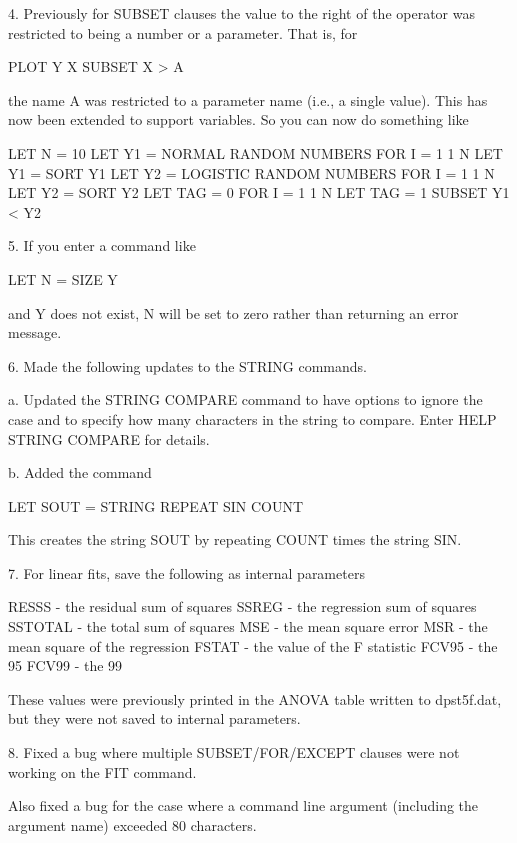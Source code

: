  4. Previously for SUBSET clauses the value to the right of the
    operator was restricted to being a number or a parameter.  That
    is, for

         PLOT Y X  SUBSET X > A

    the name A was restricted to a parameter name (i.e., a single
    value).  This has now been extended to support variables.  So
    you can now do something like

         LET N = 10
         LET Y1 = NORMAL RANDOM NUMBERS FOR I = 1 1 N
         LET Y1 = SORT Y1
         LET Y2 = LOGISTIC RANDOM NUMBERS FOR I = 1 1 N
         LET Y2 = SORT Y2
         LET TAG = 0 FOR I = 1 1 N
         LET TAG = 1 SUBSET Y1 < Y2

 5. If you enter a command like

       LET N = SIZE Y

    and Y does not exist, N will be set to zero rather than
    returning an error message.

 6. Made the following updates to the STRING commands.

    a. Updated the STRING COMPARE command to have options to
       ignore the case and to specify how many characters in
       the string to compare.  Enter HELP STRING COMPARE for
       details.

    b. Added the command

           LET SOUT = STRING REPEAT SIN COUNT

       This creates the string SOUT by repeating COUNT times
       the string SIN.

 7. For linear fits, save the following as internal parameters

       RESSS   - the residual sum of squares
       SSREG   - the regression sum of squares
       SSTOTAL - the total sum of squares
       MSE     - the mean square error
       MSR     - the mean square of the regression
       FSTAT   - the value of the F statistic
       FCV95   - the 95%
       FCV99   - the 99%

    These values were previously printed in the ANOVA table written to
    dpst5f.dat, but they were not saved to internal parameters.

 8. Fixed a bug where multiple SUBSET/FOR/EXCEPT clauses were not
    working on the FIT command.

    Also fixed a bug for the case where a command line argument
    (including the argument name) exceeded 80 characters.

